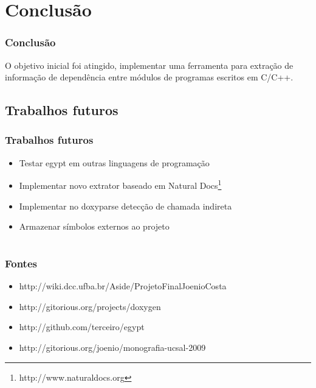 \documentclass{beamer}
\begin{document}
\section{Conclusão}

\begin{frame}
\frametitle{Conclusão}
 O objetivo inicial foi atingido, implementar uma ferramenta para extração de
 informação de dependência entre módulos de programas escritos em C/C++.
\end{frame}

\subsection{Trabalhos futuros}

\begin{frame}
\frametitle{Trabalhos futuros}
 \begin{itemize}
 \item Testar egypt em outras linguagens de programação
 \item Implementar novo extrator baseado em Natural Docs\footnote{http://www.naturaldocs.org}
 \item Implementar no doxyparse detecção de chamada indireta
 \item Armazenar símbolos externos ao projeto
 \end{itemize}
\end{frame}

\section{}

\begin{frame}
\frametitle{Fontes}
 \begin{itemize}
 \item http://wiki.dcc.ufba.br/Aside/ProjetoFinalJoenioCosta
 \item http://gitorious.org/projects/doxygen
 \item http://github.com/terceiro/egypt
 \item http://gitorious.org/joenio/monografia-ucsal-2009
 \end{itemize}
\end{frame}
\end{document}
